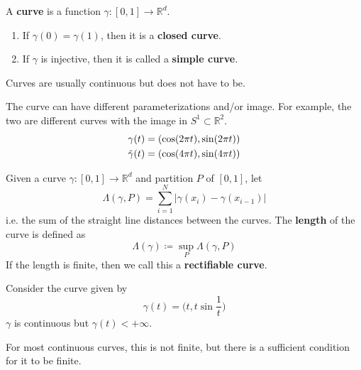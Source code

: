   \begin{definition}[Curve]
    A \textbf{curve} is a function $\gamma: [0, 1] \to \mathbb{R}^d$. 
    \begin{enumerate}
      \item If $\gamma(0) = \gamma(1)$, then it is a \textbf{closed curve}. 
      \item If $\gamma$ is injective, then it is called a \textbf{simple curve}. 
    \end{enumerate}
  \end{definition}

  Curves are usually continuous but does not have to be. 

  \begin{example}
    The curve can have different parameterizations and/or image. For example, the two are different curves with the image in $S^1 \subset \mathbb{R}^2$. 
    \begin{align}
      \gamma(t) & = (\cos(2 \pi t), \sin(2 \pi t)) \\ 
      \Tilde{\gamma}(t) & = (\cos(4 \pi t), \sin(4 \pi t))
    \end{align} 
  \end{example}

  \begin{definition}
    Given a curve $\gamma: [0, 1] \to \mathbb{R}^d$ and partition $P$ of $[0, 1]$, let 
    \begin{equation}
      \Lambda(\gamma, P) = \sum_{i=1}^N | \gamma(x_i) - \gamma(x_{i-1})| 
    \end{equation}
    i.e. the sum of the straight line distances between the curves. The \textbf{length} of the curve is defined as 
    \begin{equation}
      \Lambda(\gamma) \coloneqq \sup_P \Lambda(\gamma, P)
    \end{equation}
    If the length is finite, then we call this a \textbf{rectifiable curve}. 
  \end{definition}

  \begin{example}
    Consider the curve given by 
    \begin{equation}
      \gamma(t) = \bigg( t, t \sin \frac{1}{t} \bigg)
    \end{equation}
    $\gamma$ is continuous but $\gamma(t) < +\infty$. 
  \end{example}

  For most continuous curves, this is not finite, but there is a sufficient condition for it to be finite. 

